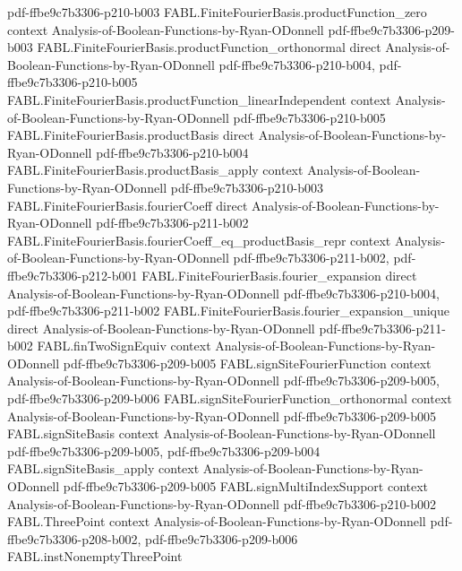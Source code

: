 \begin{theorem}
  {pdf-ffbe9c7b3306-p210-b003}
\proofstep
  {FABL.FiniteFourierBasis.productFunction_zero}
  {context}
  {Analysis-of-Boolean-Functions-by-Ryan-ODonnell}
  {pdf-ffbe9c7b3306-p209-b003}
\proofstep
  {FABL.FiniteFourierBasis.productFunction_orthonormal}
  {direct}
  {Analysis-of-Boolean-Functions-by-Ryan-ODonnell}
  {pdf-ffbe9c7b3306-p210-b004,
    pdf-ffbe9c7b3306-p210-b005}
\proofstep
  {FABL.FiniteFourierBasis.productFunction_linearIndependent}
  {context}
  {Analysis-of-Boolean-Functions-by-Ryan-ODonnell}
  {pdf-ffbe9c7b3306-p210-b005}
\proofstep
  {FABL.FiniteFourierBasis.productBasis}
  {direct}
  {Analysis-of-Boolean-Functions-by-Ryan-ODonnell}
  {pdf-ffbe9c7b3306-p210-b004}
\proofstep
  {FABL.FiniteFourierBasis.productBasis_apply}
  {context}
  {Analysis-of-Boolean-Functions-by-Ryan-ODonnell}
  {pdf-ffbe9c7b3306-p210-b003}
\proofstep
  {FABL.FiniteFourierBasis.fourierCoeff}
  {direct}
  {Analysis-of-Boolean-Functions-by-Ryan-ODonnell}
  {pdf-ffbe9c7b3306-p211-b002}
\proofstep
  {FABL.FiniteFourierBasis.fourierCoeff_eq_productBasis_repr}
  {context}
  {Analysis-of-Boolean-Functions-by-Ryan-ODonnell}
  {pdf-ffbe9c7b3306-p211-b002,
    pdf-ffbe9c7b3306-p212-b001}
\proofstep
  {FABL.FiniteFourierBasis.fourier_expansion}
  {direct}
  {Analysis-of-Boolean-Functions-by-Ryan-ODonnell}
  {pdf-ffbe9c7b3306-p210-b004,
    pdf-ffbe9c7b3306-p211-b002}
\proofstep
  {FABL.FiniteFourierBasis.fourier_expansion_unique}
  {direct}
  {Analysis-of-Boolean-Functions-by-Ryan-ODonnell}
  {pdf-ffbe9c7b3306-p211-b002}
\proofstep
  {FABL.finTwoSignEquiv}
  {context}
  {Analysis-of-Boolean-Functions-by-Ryan-ODonnell}
  {pdf-ffbe9c7b3306-p209-b005}
\proofstep
  {FABL.signSiteFourierFunction}
  {context}
  {Analysis-of-Boolean-Functions-by-Ryan-ODonnell}
  {pdf-ffbe9c7b3306-p209-b005,
    pdf-ffbe9c7b3306-p209-b006}
\proofstep
  {FABL.signSiteFourierFunction_orthonormal}
  {context}
  {Analysis-of-Boolean-Functions-by-Ryan-ODonnell}
  {pdf-ffbe9c7b3306-p209-b005}
\proofstep
  {FABL.signSiteBasis}
  {context}
  {Analysis-of-Boolean-Functions-by-Ryan-ODonnell}
  {pdf-ffbe9c7b3306-p209-b005,
    pdf-ffbe9c7b3306-p209-b004}
\proofstep
  {FABL.signSiteBasis_apply}
  {context}
  {Analysis-of-Boolean-Functions-by-Ryan-ODonnell}
  {pdf-ffbe9c7b3306-p209-b005}
\proofstep
  {FABL.signMultiIndexSupport}
  {context}
  {Analysis-of-Boolean-Functions-by-Ryan-ODonnell}
  {pdf-ffbe9c7b3306-p210-b002}
\proofstep
  {FABL.ThreePoint}
  {context}
  {Analysis-of-Boolean-Functions-by-Ryan-ODonnell}
  {pdf-ffbe9c7b3306-p208-b002,
    pdf-ffbe9c7b3306-p209-b006}
\proofstep
  {FABL.instNonemptyThreePoint}

\end{theorem}
